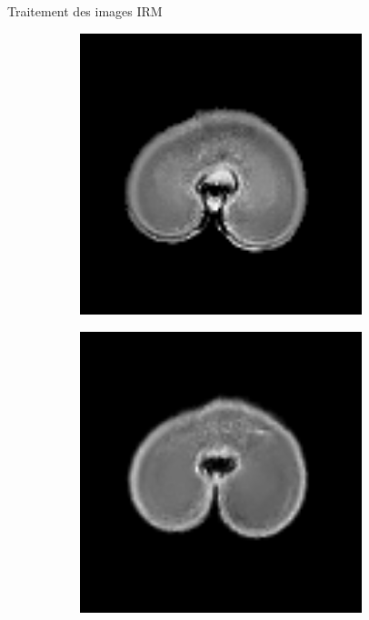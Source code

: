 \documentclass[10pt]{beamer}
\begin{document}
\begin{frame}{Traitement des images IRM}
\begin{figure}[ht]
\begin{subfigure}[t]{0.33\textwidth}
      \includegraphics[width=0.9\textwidth]{fig/irm_500_density_s5}
      \caption{}
      \label{subfig:irm_500_density_s5}
    \end{subfigure}%
    \begin{subfigure}[t]{0.33\textwidth}
      \centering
      \includegraphics[width=0.9\textwidth]{fig/irm_650_density_s8}
      \caption{}
      \label{subfig:irm_650_density_s8}
    \end{subfigure}%
  \end{figure}


\end{frame}
\end{document}
